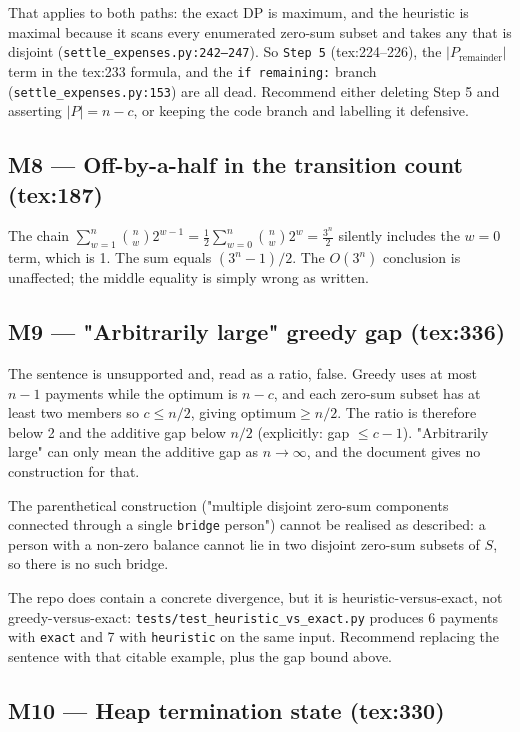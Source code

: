 \documentclass[11pt]{article}
\begin{document}
That applies to both paths: the exact DP is maximum, and the heuristic is maximal because it scans every
enumerated zero-sum subset and takes any that is disjoint (\texttt{settle\_expenses.py:242--247}). So
\texttt{Step 5} (tex:224--226), the $|P_{\text{remainder}}|$ term in the tex:233 formula, and the
\texttt{if remaining:} branch (\texttt{settle\_expenses.py:153}) are all dead. Recommend either deleting
Step 5 and asserting $|P| = n - c$, or keeping the code branch and labelling it defensive.

\subsection{M8 --- Off-by-a-half in the transition count (tex:187)}

The chain
$\sum_{w=1}^{n} \binom{n}{w} 2^{w-1} = \frac12 \sum_{w=0}^{n} \binom{n}{w} 2^w = \frac{3^n}{2}$
silently includes the $w=0$ term, which is 1. The sum equals $(3^n - 1)/2$. The $O(3^n)$ conclusion
is unaffected; the middle equality is simply wrong as written.

\subsection{M9 --- "Arbitrarily large" greedy gap (tex:336)}

The sentence is unsupported and, read as a ratio, false. Greedy uses at most $n-1$ payments while the
optimum is $n-c$, and each zero-sum subset has at least two members so $c \le n/2$, giving
$\text{optimum} \ge n/2$. The ratio is therefore below 2 and the additive gap below $n/2$
(explicitly: gap $\le c - 1$). "Arbitrarily large" can only mean the additive gap as $n \to \infty$,
and the document gives no construction for that.

The parenthetical construction ("multiple disjoint zero-sum components connected through a single
\texttt{bridge} person") cannot be realised as described: a person with a non-zero balance cannot lie in
two disjoint zero-sum subsets of $S$, so there is no such bridge.

The repo does contain a concrete divergence, but it is heuristic-versus-exact, not greedy-versus-exact:
\texttt{tests/test\_heuristic\_vs\_exact.py} produces 6 payments with \texttt{exact} and 7 with
\texttt{heuristic} on the same input. Recommend replacing the sentence with that citable example, plus
the gap bound above.

\subsection{M10 --- Heap termination state (tex:330)}
\end{document}
